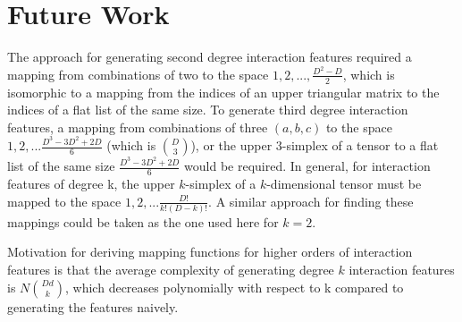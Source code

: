 \documentclass[11pt]{article}
\begin{document}
\section{Future Work}
The approach for generating second degree interaction features required a mapping from 
combinations of two to the space $1,2,...,\frac{D^2-D}{2}$, which is isomorphic to a mapping from 
the indices of an upper triangular matrix to the indices of a flat list of the same size. 
To generate third degree interaction features, a mapping from combinations of three 
$(a,b,c)$ to the space $1,2,...\frac{D^3-3D^2+2D}{6}$ (which is $\binom{D}{3}$), or the upper $3$-simplex of a tensor to a flat 
list of the same size $\frac{D^3-3D^2+2D}{6}$ would be required. In general, for interaction 
features of degree k, the upper $k$-simplex of a $k$-dimensional tensor must be mapped to the 
space $1,2,...\frac{D!}{k!(D-k)!}$. A similar approach for finding these mappings could be taken 
as the one used here for $k=2$. 

Motivation for deriving mapping functions for higher orders
of interaction features is that the average complexity of generating degree $k$ interaction
features is $N \binom{Dd}{k}$, which decreases polynomially with respect to k compared to
generating the features naively.

    
\vskip 0.2in

\end{document}
